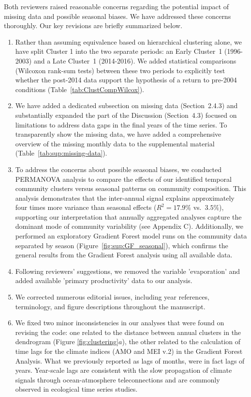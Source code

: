 \documentclass[12pt,english]{reviewresponse}
\begin{document}
\begin{revresponse}
    Both reviewers raised reasonable concerns regarding the potential impact of missing data and possible seasonal biases. We have addressed these concerns thoroughly. Our key revisions are briefly summarized below.
    \begin{enumerate}
        \item Rather than assuming equivalence based on hierarchical clustering alone, we have split Cluster 1 into the two separate periods: an Early Cluster~1 (1996-2003) and a Late Cluster~1 (2014-2016). We added statistical comparisons (Wilcoxon rank-sum tests) between these two periods to explicitly test whether the post-2014 data support the hypothesis of a return to pre-2004 conditions (Table~\ref{tab:ClustCompWilcox}).
        \item We have added a dedicated subsection on missing data (Section~2.4.3) and substantially expanded the part of the Discussion (Section~4.3) focused on limitations to address data gaps in the final years of the time series. To transparently show the missing data, we have added a comprehensive overview of the missing monthly data to the supplemental material (Table~\ref{tab:sup:missing-data}).
        \item To address the concerns about possible seasonal biases, we conducted PERMANOVA analysis to compare the effects of our identified temporal community clusters versus seasonal patterns on community composition. This analysis demonstrates that the inter-annual signal explains approximately four times more variance than seasonal effects ($R^2 = 17.9\%$ vs.\ $3.5\%$), supporting our interpretation that annually aggregated analyses capture the dominant mode of community variability (see Appendix C). Additionally, we performed an exploratory Gradient Forest model runs on the community data separated by season (Figure~\ref{fig:sup:GF_seasonal}), which confirms the general results from the Gradient Forest analysis using all available data.
        \item Following reviewers' suggestions, we removed the variable 'evaporation' and added available 'primary productivity' data to our analysis.
        \item We corrected numerous editorial issues, including year references, terminology, and figure descriptions throughout the manuscript.
        \item We fixed two minor inconsistencies in our analyses that were found on revising the code: one related to the distance between annual clusters in the dendrogram (Figure \ref{fig:clustering}$a$), the other related to the calculation of time lags for the climate indices (AMO and MEI v.2) in the Gradient Forest Analysis. What we previously reported as lags of months, were in fact lags of years. Year-scale lags are consistent with the slow propagation of climate signals through ocean-atmosphere teleconnections and are commonly observed in ecological time series studies.

\end{enumerate}
\end{revresponse}
\end{document}
